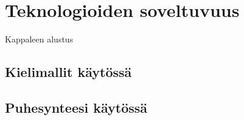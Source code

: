 \chapter{Teknologioiden soveltuvuus}%
\label{ch:soveltuvuus}

Kappaleen alustus

\section{Kielimallit käytössä}

\section{Puhesynteesi käytössä}
